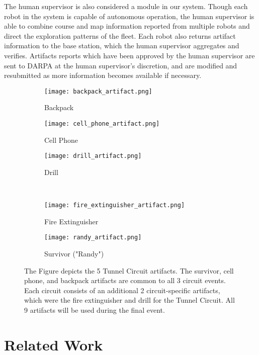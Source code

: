 The human supervisor is also considered a module in our system. Though each robot in the system is capable of autonomous operation, the human supervisor is able to combine course and map information reported from multiple robots and direct the exploration patterns of the fleet. Each robot also returns artifact information to the base station, which the human supervisor aggregates and verifies. Artifacts reports which have been approved by the human supervisor are sent to DARPA at the human supervisor's discretion, and are modified and resubmitted as more information becomes available if necessary.

\begin{figure}
	\centering
	\begin{subfigure}{0.32\textwidth}
		\texttt{[image: backpack\_artifact.png]}
		\caption{Backpack}
		\label{backpack}		
	\end{subfigure}
	\hfill
	\begin{subfigure}{0.32\textwidth}
		\texttt{[image: cell\_phone\_artifact.png]}
		\caption{Cell Phone}
		\label{cell phone}
	\end{subfigure}	
	\hfill
	\begin{subfigure}{0.32\textwidth}
		\texttt{[image: drill\_artifact.png]}
		\caption{Drill}
		\label{drill}
	\end{subfigure}
	\\
	\begin{subfigure}{0.47\textwidth}
		\texttt{[image: fire\_extinguisher\_artifact.png]}
		\caption{Fire Extinguisher}
		\label{fire extinguisher}
	\end{subfigure}	
	\hfill
	\begin{subfigure}{0.47\textwidth}
		\texttt{[image: randy\_artifact.png]}
		\caption{Survivor ("Randy")}
		\label{randy}
	\end{subfigure}	
	\caption[Tunnel Circuit artifacts]{The Figure depicts the 5 Tunnel Circuit artifacts. The survivor, cell phone, and backpack artifacts are common to all 3 circuit events. Each circuit consists of an additional 2 circuit-specific artifacts, which were the fire extinguisher and drill for the Tunnel Circuit. All 9 artifacts will be used during the final event.}
	\label{tunnel artifacts}
\end{figure}

\section{Related Work}

